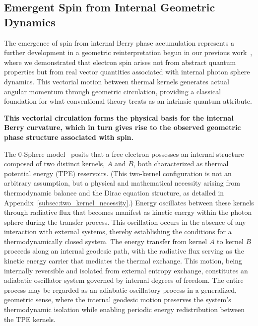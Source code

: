 \documentclass[%
 reprint,
 amsmath,amssymb,
 aps,
]{revtex4-1}
\numberwithin{equation}{section}%
\begin{document}
\subsection{Emergent Spin from Internal Geometric Dynamics} \label{subsec:emergent_spin}

The emergence of spin from internal Berry phase accumulation represents a further development in a geometric reinterpretation begun in our previous work~\cite{hanamura2506.0072}, where we demonstrated that electron spin arises not from abstract quantum properties but from real vector quantities associated with internal photon sphere dynamics. This vectorial motion between thermal kernels generates actual angular momentum through geometric circulation, providing a classical foundation for what conventional theory treats as an intrinsic quantum attribute.

\textbf{This vectorial circulation forms the physical basis for the internal Berry curvature, which in turn gives rise to the observed geometric phase structure associated with spin.}

The 0-Sphere model~\cite{hanamura2501.0130} posits that a free electron possesses an internal structure composed of two distinct kernels, $A$ and $B$, both characterized as thermal potential energy (TPE) reservoirs. (This two-kernel configuration is not an arbitrary assumption, but a physical and mathematical necessity arising from thermodynamic balance and the Dirac equation structure, as detailed in Appendix~\ref{subsec:two_kernel_necessity}.) Energy oscillates between these kernels through radiative flux that becomes manifest as kinetic energy within the photon sphere during the transfer process. This oscillation occurs in the absence of any interaction with external systems, thereby establishing the conditions for a thermodynamically closed system. The energy transfer from kernel $A$ to kernel $B$ proceeds along an internal geodesic path, with the radiative flux serving as the kinetic energy carrier that mediates the thermal exchange. This motion, being internally reversible and isolated from external entropy exchange, constitutes an adiabatic oscillator system governed by internal degrees of freedom. The entire process may be regarded as an adiabatic oscillatory process in a generalized, geometric sense, where the internal geodesic motion preserves the system's thermodynamic isolation while enabling periodic energy redistribution between the TPE kernels.
\end{document}
